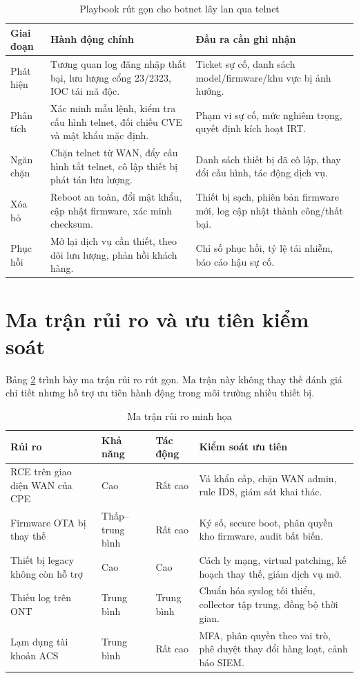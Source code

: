 \documentclass[../DoAn.tex]{subfiles}
\begin{document}
\begin{table}[H]
\centering
\begin{tabular}{|p{2.5cm}|p{5.1cm}|p{5.2cm}|}
\hline
\textbf{Giai đoạn} & \textbf{Hành động chính} & \textbf{Đầu ra cần ghi nhận} \\ \hline
Phát hiện & Tương quan log đăng nhập thất bại, lưu lượng cổng 23/2323, IOC tải mã độc. & Ticket sự cố, danh sách model/firmware/khu vực bị ảnh hưởng. \\ \hline
Phân tích & Xác minh mẫu lệnh, kiểm tra cấu hình telnet, đối chiếu CVE và mật khẩu mặc định. & Phạm vi sự cố, mức nghiêm trọng, quyết định kích hoạt IRT. \\ \hline
Ngăn chặn & Chặn telnet từ WAN, đẩy cấu hình tắt telnet, cô lập thiết bị phát tán lưu lượng. & Danh sách thiết bị đã cô lập, thay đổi cấu hình, tác động dịch vụ. \\ \hline
Xóa bỏ & Reboot an toàn, đổi mật khẩu, cập nhật firmware, xác minh checksum. & Thiết bị sạch, phiên bản firmware mới, log cập nhật thành công/thất bại. \\ \hline
Phục hồi & Mở lại dịch vụ cần thiết, theo dõi lưu lượng, phản hồi khách hàng. & Chỉ số phục hồi, tỷ lệ tái nhiễm, báo cáo hậu sự cố. \\ \hline
\end{tabular}
\caption{Playbook rút gọn cho botnet lây lan qua telnet}
\label{tab:telnet-botnet-playbook}
\end{table}

\section{Ma trận rủi ro và ưu tiên kiểm soát}
Bảng \ref{tab:risk-matrix} trình bày ma trận rủi ro rút gọn. Ma trận này không thay thế đánh giá chi tiết nhưng hỗ trợ ưu tiên hành động trong môi trường nhiều thiết bị.

\begin{table}[H]
\centering
\begin{tabular}{|p{3.2cm}|p{2cm}|p{2cm}|p{5.2cm}|}
\hline
\textbf{Rủi ro} & \textbf{Khả năng} & \textbf{Tác động} & \textbf{Kiểm soát ưu tiên} \\ \hline
RCE trên giao diện WAN của CPE & Cao & Rất cao & Vá khẩn cấp, chặn WAN admin, rule IDS, giám sát khai thác. \\ \hline
Firmware OTA bị thay thế & Thấp--trung bình & Rất cao & Ký số, secure boot, phân quyền kho firmware, audit bất biến. \\ \hline
Thiết bị legacy không còn hỗ trợ & Cao & Cao & Cách ly mạng, virtual patching, kế hoạch thay thế, giảm dịch vụ mở. \\ \hline
Thiếu log trên ONT & Trung bình & Trung bình & Chuẩn hóa syslog tối thiểu, collector tập trung, đồng bộ thời gian. \\ \hline
Lạm dụng tài khoản ACS & Trung bình & Rất cao & MFA, phân quyền theo vai trò, phê duyệt thay đổi hàng loạt, cảnh báo SIEM. \\ \hline
\end{tabular}
\caption{Ma trận rủi ro minh họa}
\label{tab:risk-matrix}
\end{table}
\end{document}
